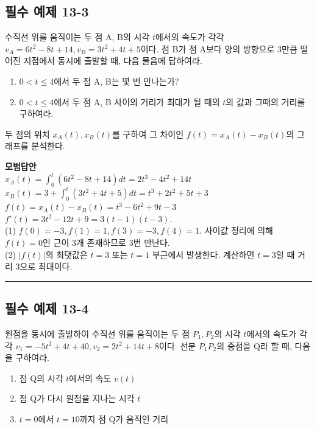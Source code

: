 \documentclass[a4paper,11pt]{article}
\begin{document}
\subsection*{필수 예제 13-3}
수직선 위를 움직이는 두 점 A, B의 시각 $t$에서의 속도가 각각 $v_A = 6t^2-8t+14, v_B = 3t^2+4t+5$이다. 점 B가 점 A보다 양의 방향으로 3만큼 떨어진 지점에서 동시에 출발할 때, 다음 물음에 답하여라.
\begin{enumerate}[label=(\arabic*)]
    \item $0 < t \le 4$에서 두 점 A, B는 몇 번 만나는가?
    \item $0 < t \le 4$에서 두 점 A, B 사이의 거리가 최대가 될 때의 $t$의 값과 그때의 거리를 구하여라.
\end{enumerate}

\begin{studybox}
두 점의 위치 $x_A(t), x_B(t)$를 구하여 그 차이인 $f(t) = x_A(t) - x_B(t)$의 그래프를 분석한다.
\end{studybox}

\textbf{모범답안} \\
$x_A(t) = \int_{0}^{t} (6t^2-8t+14) dt = 2t^3 - 4t^2 + 14t$ \\
$x_B(t) = 3 + \int_{0}^{t} (3t^2+4t+5) dt = t^3 + 2t^2 + 5t + 3$ \\
$f(t) = x_A(t) - x_B(t) = t^3 - 6t^2 + 9t - 3$ \\
$f'(t) = 3t^2 - 12t + 9 = 3(t-1)(t-3)$. \\
(1) $f(0)=-3, f(1)=1, f(3)=-3, f(4)=1$. 사이값 정리에 의해 $f(t)=0$인 근이 3개 존재하므로 3번 만난다. \\
(2) $|f(t)|$의 최댓값은 $t=3$ 또는 $t=1$ 부근에서 발생한다. 계산하면 $t=3$일 때 거리 3으로 최대이다.

\vspace{0.5cm}
\hrule
\vspace{0.5cm}

\subsection*{필수 예제 13-4}
원점을 동시에 출발하여 수직선 위를 움직이는 두 점 $P_1, P_2$의 시각 $t$에서의 속도가 각각 $v_1 = -5t^2+4t+40, v_2 = 2t^2+14t+8$이다. 선분 $P_1P_2$의 중점을 Q라 할 때, 다음을 구하여라.
\begin{enumerate}[label=(\arabic*)]
    \item 점 Q의 시각 $t$에서의 속도 $v(t)$
    \item 점 Q가 다시 원점을 지나는 시각 $t$
    \item $t=0$에서 $t=10$까지 점 Q가 움직인 거리
\end{enumerate}
\end{document}
